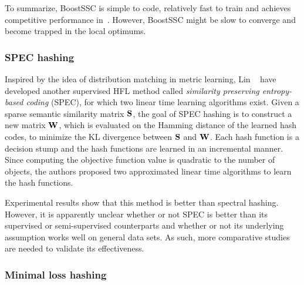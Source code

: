To summarize, \mbox{BoostSSC} is simple to code, relatively fast to train and achieves competitive performance in~\cite{torralba2008cvpr}. However, \mbox{BoostSSC} might be slow to converge and become trapped in the local optimums.

\subsubsection{SPEC hashing}

Inspired by the idea of distribution matching in metric learning, Lin \etal~\cite{lin2010cvpr} have developed another supervised HFL method called \textit{similarity preserving entropy-based coding} (\mbox{SPEC}), for which two linear time learning algorithms exist. Given a sparse semantic similarity matrix $ \S $, the goal of \mbox{SPEC} hashing is to construct a new matrix $ \W $, which is evaluated on the Hamming distance of the learned hash codes, to minimize the KL divergence between $ \S $ and $ \W $. Each hash function is a decision stump and the hash functions are learned in an incremental manner. Since computing the objective function value is quadratic to the number of objects, the authors proposed two approximated linear time algorithms to learn the hash functions.

Experimental results show that this method is better than spectral hashing. However, it is apparently unclear whether or not \mbox{SPEC} is better than its supervised or semi-supervised counterparts and whether or not its underlying assumption works well on general data sets. As such, more comparative studies are needed to validate its effectiveness.

\subsubsection{Minimal loss hashing} 

